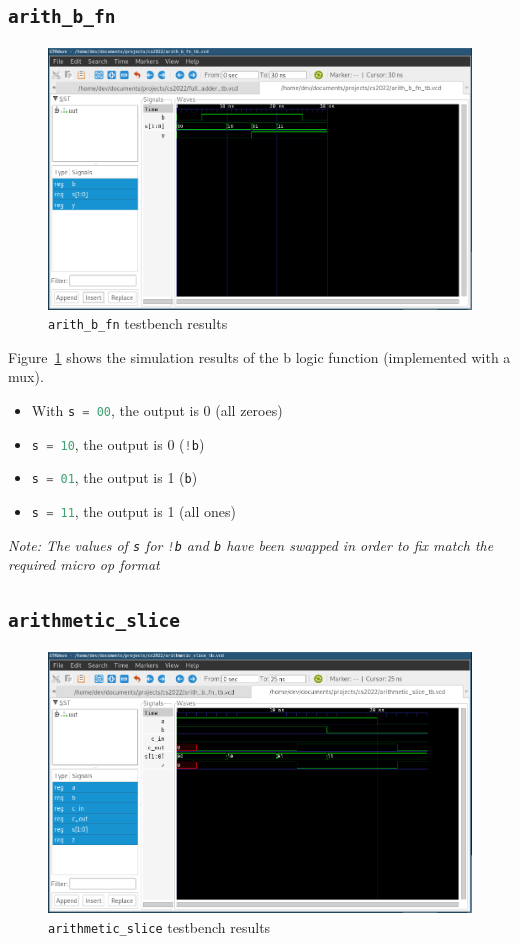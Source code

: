 \documentclass[a4paper]{article}
\numberwithin{figure}{section}
\numberwithin{table}{section}
\newcommand{\mi}{\mintinline}
\begin{document}
\subsection{\mi{c}{arith_b_fn}}
\begin{figure}[h!]
	\centering
	\includegraphics[width=\textwidth]{arith_b_fn_tb}
	\caption{\mi{c}{arith_b_fn} testbench results}
	\label{fig:arithb}
\end{figure}

Figure~\ref{fig:arithb} shows the simulation results of the b logic function (implemented with a mux).
\begin{itemize}
	\item With \mi{c}{s = 00}, the output is 0 (all zeroes)
	\item \mi{c}{s = 10}, the output is 0 (\mi{c}{!b})
	\item \mi{c}{s = 01}, the output is 1 (\mi{c}{b})
	\item \mi{c}{s = 11}, the output is 1 (all ones)
\end{itemize}
\emph{Note: The values of \mi{c}{s} for \mi{c}{!b} and \mi{c}{b} have been swapped in order to fix match the required micro op format}

\newpage
\subsection{\mi{c}{arithmetic_slice}}
\begin{figure}[h!]
	\centering
	\includegraphics[width=\textwidth]{arithmetic_slice_tb}
	\caption{\mi{c}{arithmetic_slice} testbench results}
	\label{fig:arithslice}
\end{figure}
\end{document}
